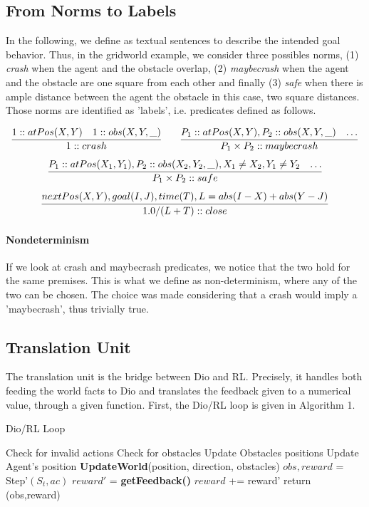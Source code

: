 \subsection{From Norms to Labels}
In the following, we define \textbf{} as textual sentences to describe the intended goal behavior. 
Thus, in the gridworld example, we consider three possibles norms, (1) \textit{crash} when the agent and the obstacle overlap, (2) \textit{maybecrash} 
when the agent and the obstacle are one square from each other and finally (3) \textit{safe} when there is ample distance between the agent the obstacle 
in this case, two square distances. Those norms are identified as 'labels', i.e. predicates defined as follows. 

\[
    \infer{1 :: crash}{1 :: atPos(X,Y) & 1 :: obs(X,Y,\_)} 
    \qquad
    \infer{P_1 \times P_2 :: maybecrash}{P_1::atPos(X,Y), P_2::obs(X,Y,\_)
      & \ldots}
\] 
\[
    \infer{P_1 \times P_2 :: safe}{
      P_1::atPos(X_1,Y_1), P_2::obs(X_2,Y_2,\_),X_1 \neq X_2, Y_1 \neq Y_2
      & \ldots
    }
\]
\[
  \infer{1.0/(L+T) :: close}{
    nextPos(X,Y), goal(I,J), time(T), L = abs(I-X) + abs(Y-J)
  }
\]

 \paragraph{Nondeterminism} 
 If we look at crash and maybecrash predicates, we notice that the two hold for the 
 same premises. This is what we define as non-determinism, where any of the two can be chosen. 
 The choice was made considering that a crash would imply a 'maybecrash', thus trivially true. 

\subsection{Translation Unit}
The translation unit is the bridge between Dio and RL. Precisely, it handles both feeding 
the world facts to Dio and translates the feedback given to a numerical value, through 
a given function. First, the Dio/RL loop is given in Algorithm 1. 

  \begin{algorithm}[H]
    \caption{Dio/RL Loop}
    \begin{algorithmic}[1]
    
           
        \State Check for invalid actions
        \State Check for obstacles 
        \State Update Obstacles positions
        \State Update Agent's position
        \State \textbf{UpdateWorld}(position, direction, obstacles) 
        \State $obs, reward$ = Step'$(S_t, ac)$ 
        \State $reward'$ = \textbf{getFeedback()} 
            \State $reward$ += reward'
        \EndIf
        \State return (obs,reward)
    \EndProcedure
    
    \end{algorithmic}
    \end{algorithm}

